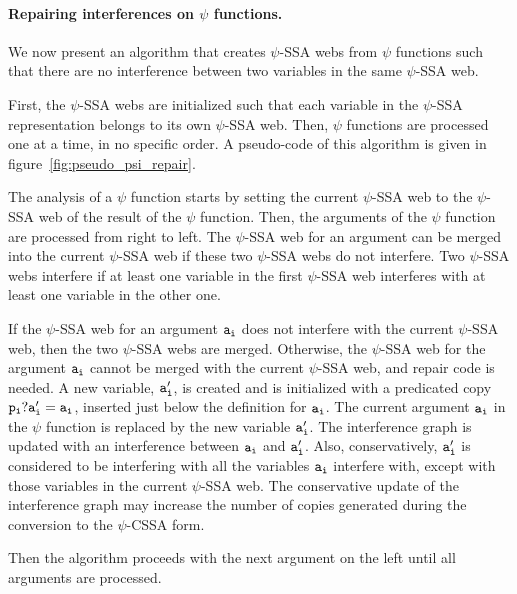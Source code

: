 \paragraph{Repairing interferences on $\psi$ functions.}
We now present an algorithm that creates $\psi$-SSA webs from $\psi$
functions such that there are no interference between two variables in
the same $\psi$-SSA web.

First, the $\psi$-SSA webs are initialized such that each variable in
the $\psi$-SSA representation belongs to its own $\psi$-SSA web. Then,
$\psi$ functions are processed one at a time, in no specific order. A
pseudo-code of this algorithm is given in
figure~\ref{fig:pseudo_psi_repair}.

The analysis of a $\psi$ function starts by setting the current
$\psi$-SSA web to the $\psi$-SSA web of the result of the $\psi$
function. Then, the arguments of the $\psi$ function are processed
from right to left. The $\psi$-SSA web for an argument can be merged
into the current $\psi$-SSA web if these two $\psi$-SSA webs do not
interfere. Two $\psi$-SSA webs interfere if at least one variable in
the first $\psi$-SSA web interferes with at least one variable in the
other one.

If the $\psi$-SSA web for an argument ${\tt a_i}$ does not interfere
with the current $\psi$-SSA web, then the two $\psi$-SSA webs are
merged. Otherwise, the $\psi$-SSA web for the argument ${\tt a_i}$
cannot be merged with the current $\psi$-SSA web, and repair code is
needed. A new variable, ${\tt a'_i}$, is created and is initialized
with a predicated copy ${\tt p_i? a'_i = a_i}$, inserted just below
the definition for ${\tt a_i}$. The current argument ${\tt a_i}$ in
the $\psi$ function is replaced by the new variable ${\tt a'_i}$. The
interference graph is updated with an interference between ${\tt a_i}$
and ${\tt a'_i}$. Also, conservatively, ${\tt a'_i}$ is considered to
be interfering with all the variables ${\tt a_i}$ interfere with,
except with those variables in the current $\psi$-SSA web. The
conservative update of the interference graph may increase the number
of copies generated during the conversion to the $\psi$-CSSA form.

Then the algorithm proceeds with the next argument on the left until
all arguments are processed.

